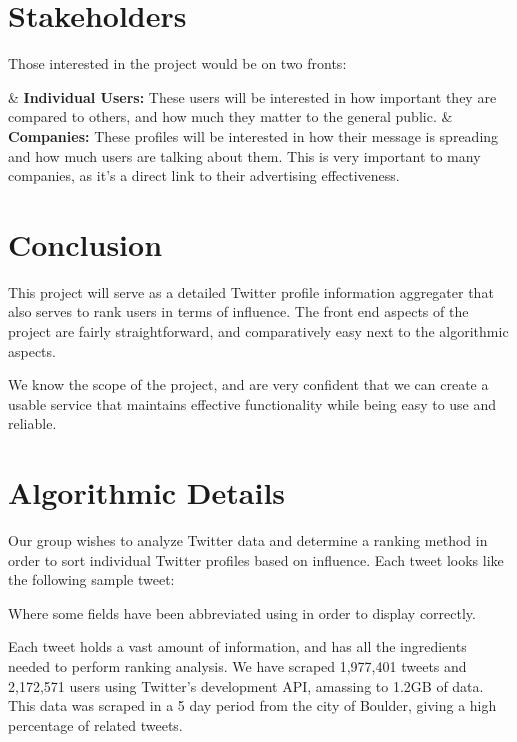 \documentclass[10pt]{article}
\begin{document}
\section{Stakeholders}
Those interested in the project would be on two fronts:

    \NewList
    \begin{easylist}[enumerate]
        & \textbf{Individual Users:} These users will be interested in how important they are compared to others, and how much they matter to the general public.
        & \textbf{Companies:} These profiles will be interested in how their message is spreading and how much users are talking about them. This is very important to many companies, as it's a direct link to their advertising effectiveness.
    \end{easylist}

\section{Conclusion}
This project will serve as a detailed Twitter profile information aggregater that also serves to rank users in terms of influence. The front end aspects of the project are fairly straightforward, and comparatively easy next to the algorithmic aspects.

We know the scope of the project, and are very confident that we can create a usable service that maintains effective functionality while being easy to use and reliable.

\appendix

\section{Algorithmic Details}\label{app:algorithm}
Our group wishes to analyze Twitter data and determine a ranking method in order to sort individual Twitter profiles based on influence. Each tweet looks like the following sample tweet:

\begin{center}\end{center}\label{code:tweetdump}

Where some fields have been abbreviated using {\ttfamily < >} in order to display correctly.

Each tweet holds a vast amount of information, and has all the ingredients needed to perform ranking analysis. We have scraped 1,977,401 tweets and 2,172,571 users using Twitter's development API, amassing to 1.2GB of data. This data was scraped in a 5 day period from the city of Boulder, giving a high percentage of related tweets.
\end{document}
